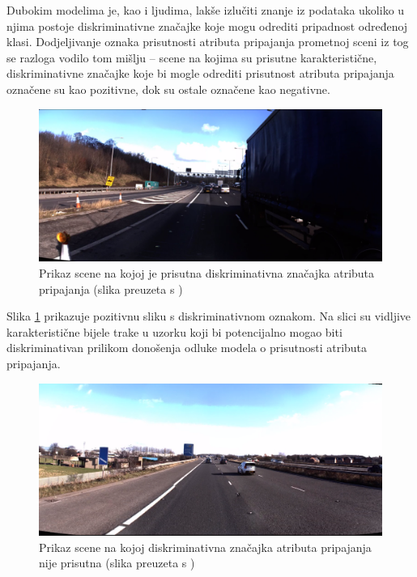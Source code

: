 \documentclass[times, utf8, diplomski, numeric]{fer}
\begin{document}
Dubokim modelima je, kao i ljudima, lakše izlučiti znanje iz podataka ukoliko u njima postoje diskriminativne značajke koje mogu odrediti pripadnost određenoj klasi.
Dodjeljivanje oznaka prisutnosti atributa pripajanja prometnoj sceni iz tog se razloga vodilo tom mišlju -- scene na kojima su prisutne karakteristične, diskriminativne značajke koje bi mogle odrediti prisutnost atributa pripajanja označene su kao pozitivne, dok su ostale označene kao negativne.

\begin{figure}[H]
\centering
\includegraphics[scale=0.15]{images/hand_labeled_positive.png}
\caption{Prikaz scene na kojoj je prisutna diskriminativna značajka atributa pripajanja (slika preuzeta s \citep{url:ftts_irap})}
\label{img:hand_labeled_positive}
\end{figure}

\noindent Slika \ref{img:hand_labeled_positive} prikazuje pozitivnu sliku s diskriminativnom oznakom. 
Na slici su vidljive karakteristične bijele trake u uzorku koji bi potencijalno mogao biti diskriminativan prilikom donošenja odluke modela o prisutnosti atributa pripajanja.

\begin{figure}[H]
\centering
\includegraphics[scale=0.15]{images/hand_labeled_negative.png}
\caption{Prikaz scene na kojoj diskriminativna značajka atributa pripajanja nije prisutna (slika preuzeta s \citep{url:ftts_irap})}
\label{img:hand_labeled_negative}
\end{figure}
\end{document}
